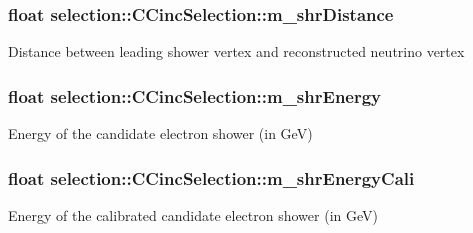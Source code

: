 \subsubsection[{\texorpdfstring{m\+\_\+shr\+Distance}{m_shrDistance}}]{\setlength{\rightskip}{0pt plus 5cm}float selection\+::\+C\+Cinc\+Selection\+::m\+\_\+shr\+Distance\hspace{0.3cm}{\ttfamily [private]}}\hypertarget{classselection_1_1CCincSelection_ae496cb17c72b3ed96b13484a1ff9e3fb}{}\label{classselection_1_1CCincSelection_ae496cb17c72b3ed96b13484a1ff9e3fb}
Distance between leading shower vertex and reconstructed neutrino vertex 
\subsubsection[{\texorpdfstring{m\+\_\+shr\+Energy}{m_shrEnergy}}]{\setlength{\rightskip}{0pt plus 5cm}float selection\+::\+C\+Cinc\+Selection\+::m\+\_\+shr\+Energy\hspace{0.3cm}{\ttfamily [private]}}\hypertarget{classselection_1_1CCincSelection_a2650ff351a7a6589c2b6ff9f701da321}{}\label{classselection_1_1CCincSelection_a2650ff351a7a6589c2b6ff9f701da321}
Energy of the candidate electron shower (in GeV) 
\subsubsection[{\texorpdfstring{m\+\_\+shr\+Energy\+Cali}{m_shrEnergyCali}}]{\setlength{\rightskip}{0pt plus 5cm}float selection\+::\+C\+Cinc\+Selection\+::m\+\_\+shr\+Energy\+Cali\hspace{0.3cm}{\ttfamily [private]}}\hypertarget{classselection_1_1CCincSelection_adec1b19741776f6e33a88b4d0f2b6330}{}\label{classselection_1_1CCincSelection_adec1b19741776f6e33a88b4d0f2b6330}
Energy of the calibrated candidate electron shower (in GeV) 
